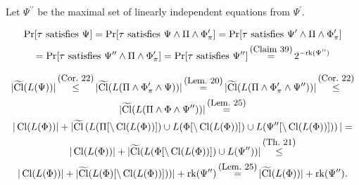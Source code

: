 \documentclass[10pt,a4paper]{article}
\begin{document}
Let $\Psi^{\prime\prime}$ be the maximal set of linearly independent equations from $\Psi^{\prime}$.\par





 
\[\begin{gathered}\Pr[\tau\mbox{ satisfies }\Psi]=\Pr[\tau\mbox{ satisfies }\Psi\land\Pi\land\Phi^{\prime}_{\pi}]=\Pr[\tau\mbox{ satisfies }\Psi^{\prime}\land\Pi\land\Phi^{\prime}_{\pi}]\\
=\Pr[\tau\mbox{ satisfies }\Psi^{\prime\prime}\land\Pi\land\Phi^{\prime}_{\pi}]=\Pr[\tau\mbox{ satisfies }\Psi^{\prime\prime}]\mathop{=}\limits^{\mbox{\small(Claim\leavevmode\nobreak\ 39)}}2^{-\mathrm{rk}(\Psi^{\prime\prime})}\end{gathered}\] 
 








 
\[\begin{gathered}|\widetilde{\mathop{\mathrm{Cl}}}(L(\Psi))|\mathop{\leq}\limits^{\mbox{\small(Cor.\leavevmode\nobreak\ 22)}}|\widetilde{\mathop{\mathrm{Cl}}}(L(\Pi\land\Phi^{\prime}_{\pi}\land\Psi))|\mathop{=}\limits^{\mbox{\small(Lem.\leavevmode\nobreak\ 20)}}|\widetilde{\mathop{\mathrm{Cl}}}(L(\Pi\land\Phi^{\prime}_{\pi}\land\Psi^{\prime\prime}))|\mathop{\leq}\limits^{\mbox{\small(Cor.\leavevmode\nobreak\ 22)}}\\
|\widetilde{\mathop{\mathrm{Cl}}}(L(\Pi\land\Phi\land\Psi^{\prime\prime}))|\mathop{=}\limits^{\mbox{\small(Lem.\leavevmode\nobreak\ 25)}}\\
|\mathop{\mathrm{Cl}}(L(\Phi))|+|\widetilde{\mathop{\mathrm{Cl}}}\left(L(\Pi[\setminus\mathop{\mathrm{Cl}}(L(\Phi))])\cup L(\Phi[\setminus\mathop{\mathrm{Cl}}(L(\Phi))])\cup L(\Psi^{\prime\prime}[\setminus\mathop{\mathrm{Cl}}(L(\Phi))])\right)|=\\
|\mathop{\mathrm{Cl}}(L(\Phi))|+|\widetilde{\mathop{\mathrm{Cl}}}(L(\Phi[\setminus\mathop{\mathrm{Cl}}(L(\Phi))])\cup L(\Psi^{\prime\prime}))|\mathop{\leq}\limits^{\mbox{\small(Th.\leavevmode\nobreak\ 21)}}\\
|\mathop{\mathrm{Cl}}(L(\Phi))|+|\widetilde{\mathop{\mathrm{Cl}}}(L(\Phi)[\setminus\mathop{\mathrm{Cl}}(L(\Phi))]))|+\mathrm{rk}(\Psi^{\prime\prime})\mathop{=}\limits^{\mbox{\small(Lem.\leavevmode\nobreak\ 25)}}|\widetilde{\mathop{\mathrm{Cl}}}(L(\Phi))|+\mathrm{rk}(\Psi^{\prime\prime}).\end{gathered}\] 
 
\end{document}
